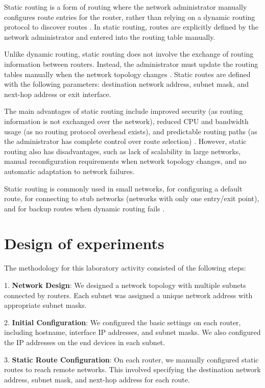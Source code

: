 \documentclass[twoside]{article}
\begin{document}
\begin{multicols}{2}
Static routing is a form of routing where the network administrator manually configures route entries for the router, rather than relying on a dynamic routing protocol to discover routes \cite{geeksforgeeks}. In static routing, routes are explicitly defined by the network administrator and entered into the routing table manually.

Unlike dynamic routing, static routing does not involve the exchange of routing information between routers. Instead, the administrator must update the routing tables manually when the network topology changes \cite{compNetWorks}. Static routes are defined with the following parameters: destination network address, subnet mask, and next-hop address or exit interface.

The main advantages of static routing include improved security (as routing information is not exchanged over the network), reduced CPU and bandwidth usage (as no routing protocol overhead exists), and predictable routing paths (as the administrator has complete control over route selection) \cite{IPCisco}. However, static routing also has disadvantages, such as lack of scalability in large networks, manual reconfiguration requirements when network topology changes, and no automatic adaptation to network failures.

Static routing is commonly used in small networks, for configuring a default route, for connecting to stub networks (networks with only one entry/exit point), and for backup routes when dynamic routing fails \cite{compNetWorks}.


\section{Design of experiments}
The methodology for this laboratory activity consisted of the following steps:

1. \textbf{Network Design}: We designed a network topology with multiple subnets connected by routers. Each subnet was assigned a unique network address with appropriate subnet masks.

2. \textbf{Initial Configuration}: We configured the basic settings on each router, including hostname, interface IP addresses, and subnet masks. We also configured the IP addresses on the end devices in each subnet.

3. \textbf{Static Route Configuration}: On each router, we manually configured static routes to reach remote networks. This involved specifying the destination network address, subnet mask, and next-hop address for each route.


\end{multicols}
\end{document}
